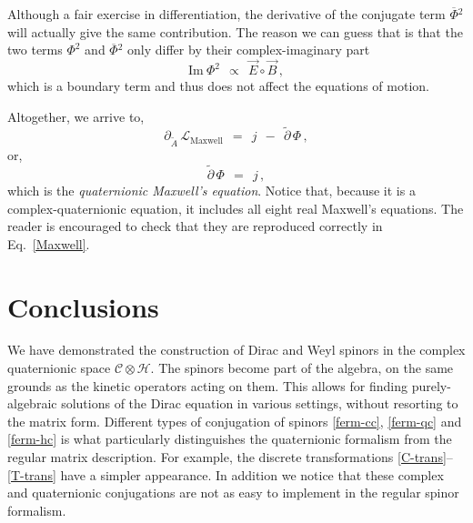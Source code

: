 \documentclass[epsfig,12pt]{article}
\newcommand{\cell}{{\mathcal L}}
\newcommand{\p}{\partial}
\newcommand{\wt}{\widetilde}
\newcommand{\ov}{\overline}
\newcommand{\cC}{\mathcal{C}}
\newcommand{\cH}{\mathcal{H}}
\begin{document}
	Although a fair exercise in differentiation, the derivative of the conjugate term $ \ov\Phi{}^2 $
	will actually give the same contribution.
	The reason we can guess that is that the two terms $ \Phi^2 $ and $ \ov\Phi{}^2 $
	only differ by their complex-imaginary part
\begin{equation}
	\text{Im}~\Phi^2	~~\propto~~	\vec E \circ \vec B\,,
\end{equation}
	which is a boundary term and thus does not affect the equations of motion.

	Altogether, we arrive to,
\begin{equation}
	\p_{\wt A}\, \cell_\text{Maxwell}	~~=~~	j  ~~-~~  \wt\p\,\Phi\,,
\end{equation}
	or,
\begin{equation}
\label{Maxwell}
	\wt\p\,\Phi	~~=~~	j\,,
\end{equation}
	which is the \emph{quaternionic Maxwell's equation}.
	Notice that, because it is a complex-quaternionic equation, 
	it includes all eight real Maxwell's equations.
	The reader is encouraged to check that they are reproduced correctly in Eq.~\eqref{Maxwell}.




\section{Conclusions}

	We have demonstrated the construction of Dirac and Weyl spinors in the complex quaternionic
	space $ \cC \otimes \cH $.
	The spinors become part of the algebra, on the same grounds as the kinetic operators acting on them.
	This allows for finding purely-algebraic solutions of the Dirac equation in various settings,
	without resorting to the matrix form.
	Different types of conjugation of spinors \eqref{ferm-cc}, \eqref{ferm-qc} and \eqref{ferm-hc}
	is what particularly distinguishes the quaternionic formalism from the regular matrix description.
	For example, the discrete transformations \eqref{C-trans}--\eqref{T-trans} have a simpler
	appearance.
	In addition we notice that these complex and quaternionic conjugations are not as easy to implement
	in the regular spinor formalism.
\end{document}
